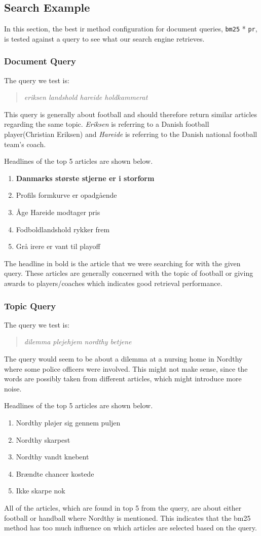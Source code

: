 \subsection{Search Example}
In this section, the best \gls{ir} method configuration for document queries, \texttt{\gls{bm25}} * \texttt{\gls{pr}}, is tested against a query to see what our search engine retrieves.


\subsubsection{Document Query}
The query we test is:
\begin{quotation}
	\textit{eriksen landshold hareide holdkammerat}
\end{quotation}
This query is generally about football and should therefore return similar articles regarding the same topic.
\textit{Eriksen} is referring to a Danish football player(Christian Eriksen) and \textit{Hareide} is referring to the Danish national football team's coach.


\noindent Headlines of the top 5 articles are shown below.
\begin{enumerate}
	\item \textbf{Danmarks største stjerne er i storform}
	\item Profils formkurve er opadgående
	\item Åge Hareide modtager pris
	\item Fodboldlandshold rykker frem
	\item Grå irere er vant til playoff
\end{enumerate}
The headline in bold is the article that we were searching for with the given query. 
These articles are generally concerned with the topic of football or giving awards to players/coaches which indicates good retrieval performance.


\subsubsection{Topic Query}
The query we test is:
\begin{quotation}
	\textit{dilemma plejehjem nordthy betjene}
\end{quotation}
The query would seem to be about a dilemma at a nursing home in Nordthy where some police officers were involved. 
This might not make sense, since the words are possibly taken from different articles, which might introduce more noise.

\noindent Headlines of the top 5 articles are shown below.
\begin{enumerate}
	\item Nordthy pløjer sig gennem puljen
	\item Nordthy skarpest
	\item Nordthy vandt knebent
	\item Brændte chancer kostede
	\item Ikke skarpe nok
\end{enumerate}
All of the articles, which are found in top 5 from the query, are about either football or handball where Nordthy is mentioned.
This indicates that the \gls{bm25} method has too much influence on which articles are selected based on the query.
